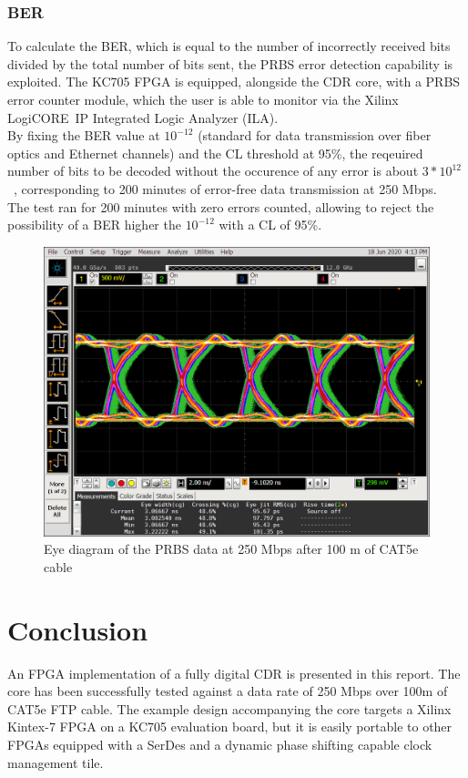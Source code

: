 \documentclass[11pt]{article}
\renewcommand{\>}{\rangle} \renewcommand{\emptyset}{\varnothing}
\begin{document}
\subsubsection{BER}
To calculate the BER, which is equal to the number of incorrectly received bits
divided by the total number of bits sent, the PRBS error detection capability is
exploited. The KC705 FPGA is equipped, alongside the CDR core, with a PRBS error
counter module, which the user is able to monitor via the Xilinx
LogiCORE\texttrademark~IP Integrated Logic Analyzer (ILA).\\
By fixing the BER value at $10^{-12}$ (standard for data transmission over fiber
optics and Ethernet channels) and the CL threshold at 95\%, the reqeuired number
of bits to be decoded without the occurence of any error is about $3 *
10^{12}$~\cite{ref:ber}, corresponding to 200 minutes of error-free data
transmission at 250
Mbps.\\
The test ran for 200 minutes with zero errors counted, allowing to reject the
possibility of a BER higher the $10^{-12}$ with a CL of 95\%.
\begin{figure}[H]
  \centerline{\includegraphics[width=0.6\linewidth]{images/eye_width}}
  \caption{Eye diagram of the PRBS data at 250 Mbps after 100 m of CAT5e cable}
  \label{fig:eye}
\end{figure}

\section{Conclusion}
An FPGA implementation of a fully digital CDR is presented in this report. The
core has been successfully tested against a data rate of 250 Mbps over 100m of
CAT5e FTP cable. The example design accompanying the core targets a Xilinx
Kintex-7 FPGA on a KC705 evaluation board, but it is easily portable to other
FPGAs equipped with a SerDes and a dynamic phase shifting capable clock
management tile.
\end{document}
